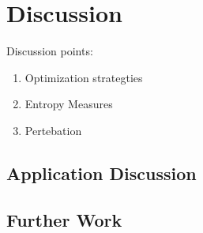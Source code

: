 \section{Discussion}
Discussion points:
\begin{enumerate}
\item Optimization strategties
\item Entropy Measures
\item Pertebation
\end{enumerate}

\subsection{Application Discussion}
\subsection{Further Work}
